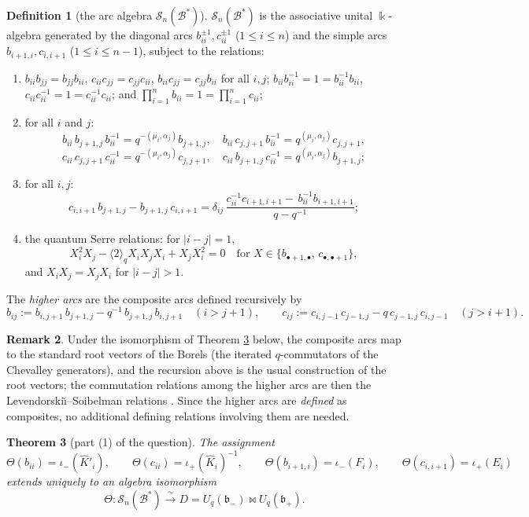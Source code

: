 \documentclass[11pt]{amsart}
\newtheorem{theorem}{Theorem}[section]
\theoremstyle{definition}
\newtheorem{definition}[theorem]{Definition}
\newtheorem{remark}[theorem]{Remark}
\newcommand{\BK}{\Bbbk}
\newcommand{\fb}{\mathfrak{b}}
\newcommand{\SN}{\mathscr{S}_n(\mathcal{B}^*)}
\newcommand{\iop}{\iota_{+}}
\newcommand{\iom}{\iota_{-}}
\newcommand{\hK}{\hat K}
\newcommand{\al}{\alpha}
\begin{document}
\begin{definition}[the arc algebra $\SN$]\label{def:arc}
$\SN$ is the associative unital $\BK$-algebra generated by the diagonal arcs
$b_{ii}^{\pm1},c_{ii}^{\pm1}$ ($1\le i\le n$) and the simple arcs
$b_{i+1,i},c_{i,i+1}$ ($1\le i\le n-1$), subject to the relations:
\begin{enumerate}
\item[\textup{(S1)}] $b_{ii}b_{jj}=b_{jj}b_{ii}$,
$c_{ii}c_{jj}=c_{jj}c_{ii}$, $b_{ii}c_{jj}=c_{jj}b_{ii}$ for all $i,j$;
$b_{ii}b_{ii}^{-1}=1=b_{ii}^{-1}b_{ii}$, $c_{ii}c_{ii}^{-1}=1=c_{ii}^{-1}c_{ii}$;
and $\prod_{i=1}^n b_{ii}=1=\prod_{i=1}^n c_{ii}$;
\item[\textup{(S2)}] for all $i$ and $j$:
\[
b_{ii}\,b_{j+1,j}\,b_{ii}^{-1}=q^{-(\mu_i,\al_j)}b_{j+1,j},\quad
b_{ii}\,c_{j,j+1}\,b_{ii}^{-1}=q^{(\mu_i,\al_j)}c_{j,j+1},
\]
\[
c_{ii}\,c_{j,j+1}\,c_{ii}^{-1}=q^{-(\mu_i,\al_j)}c_{j,j+1},\quad
c_{ii}\,b_{j+1,j}\,c_{ii}^{-1}=q^{(\mu_i,\al_j)}b_{j+1,j};
\]
\item[\textup{(S3)}] for all $i,j$:
\[
c_{i,i+1}\,b_{j+1,j}-b_{j+1,j}\,c_{i,i+1}
=\delta_{ij}\,
\frac{c_{ii}^{-1}c_{i+1,i+1}-\,b_{ii}^{-1}b_{i+1,i+1}}{q-q^{-1}};
\]
\item[\textup{(S4)}] the quantum Serre relations: for $|i-j|=1$,
\[
X_i^2X_j-\langle2\rangle_qX_iX_jX_i+X_jX_i^2=0
\quad\text{for }X\in\{b_{\bullet+1,\bullet},\,c_{\bullet,\bullet+1}\},
\]
and $X_iX_j=X_jX_i$ for $|i-j|>1$.
\end{enumerate}
The \emph{higher arcs} are the composite arcs defined recursively by
\[
b_{ij}:=b_{i,j+1}\,b_{j+1,j}-q^{-1}\,b_{j+1,j}\,b_{i,j+1}\quad(i>j+1),\qquad
c_{ij}:=c_{i,j-1}\,c_{j-1,j}-q\,c_{j-1,j}\,c_{i,j-1}\quad(j>i+1).
\]
\end{definition}

\begin{remark}\label{rem:LS}
Under the isomorphism of Theorem \ref{thm:A} below, the composite arcs map to
the standard root vectors of the Borels (the iterated $q$-commutators of the
Chevalley generators), and the recursion above is the usual construction of the
root vectors; the commutation relations among the higher arcs are then the
Levendorski\u\i--Soibelman relations \cite{LS}. Since the higher arcs are
\emph{defined} as composites, no additional defining relations involving them
are needed.
\end{remark}

\begin{theorem}[part (1) of the question]\label{thm:A}
The assignment
\[
\Theta(b_{ii})=\iom(\hK'_i),\qquad \Theta(c_{ii})=\iop(\hK_i)^{-1},\qquad
\Theta(b_{i+1,i})=\iom(F_i),\qquad \Theta(c_{i,i+1})=\iop(E_i)
\]
extends uniquely to an algebra isomorphism
\[
\Theta:\SN\xrightarrow{\;\sim\;}D=U_q(\fb_-)\bowtie U_q(\fb_+).
\]
\end{theorem}
\end{document}
